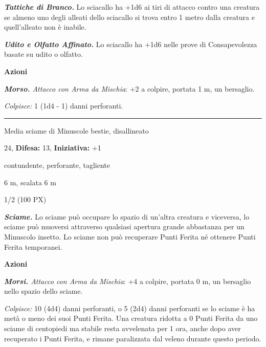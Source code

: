 \begin{multicols}{2}
{\emph{\textbf{Tattiche di Branco.}} Lo sciacallo ha +1d6 ai tiri di attacco contro una creatura se almeno uno degli alleati dello sciacallo si trova entro 1 metro dalla creatura e quell'alleato non è inabile.

\emph{\textbf{Udito e Olfatto Affinato.}} Lo sciacallo ha +1d6 nelle prove di Consapevolezza basate su udito o olfatto.

\textbf{Azioni}

\emph{\textbf{Morso.} Attacco con Arma da Mischia}: +2 a colpire, portata 1 m, un bersaglio.

\emph{Colpisce:} 1 (1d4 - 1) danni perforanti.

\smallskip\noindent\rule{\linewidth}{2pt}  \medskip {}
\begin{description}[noitemsep, topsep=0pt, parsep=0pt, partopsep=0pt, leftmargin=0cm, labelwidth=2.2cm]
    \item[\textbf{Taglia/Tipo:}] Media sciame di Minuscole bestie, disallineato
    \item[\textbf{Caratt.:}] 
    \item[\textbf{Punti Ferita:}] 24,  \textbf{Difesa:} 13,  \textbf{Iniziativa:} +1
    \item[\textbf{Resistenze al danno:}] contundente, perforante, tagliente
    \item[\textbf{Tiri Salvez.:}] 
    \item[\textbf{Movimento:}] 6 m, scalata 6 m
    \item[\textbf{Sfida:}] 1/2 (100 PX)\smallskip
\end{description}

\emph{\textbf{Sciame.}} Lo sciame può occupare lo spazio di un'altra creatura e viceversa, lo sciame può muoversi attraverso qualsiasi apertura grande abbastanza per un Minuscolo insetto. Lo sciame non può recuperare Punti Ferita né ottenere Punti Ferita temporanei.

\textbf{Azioni}

\emph{\textbf{Morsi.} Attacco con Arma da Mischia}: +4 a colpire, portata 0 m, un bersaglio nello spazio dello sciame.

\emph{Colpisce:} 10 (4d4) danni perforanti, o 5 (2d4) danni perforanti se lo sciame è ha metà o meno dei suoi Punti Ferita. Una creatura ridotta a 0 Punti Ferita da uno sciame di centopiedi ma stabile resta avvelenata per 1 ora, anche dopo aver recuperato i Punti Ferita, e rimane paralizzata dal veleno durante questo periodo.

}
\end{multicols}
